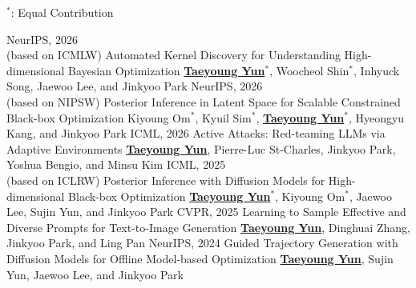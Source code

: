 \documentclass[10pt]{developercv} %
\begin{document}

\clearpage
{}

\vspace{-5pt}
$^*$: Equal Contribution
\vspace{8pt}

\begin{entrylist}
    \entry
        {NeurIPS, 2026 \\ (based on ICMLW)}
        {Automated Kernel Discovery for Understanding High-dimensional Bayesian Optimization}
        {}
        {\underline{\textbf{Taeyoung Yun}$^{*}$}, Woocheol Shin$^{*}$, Inhyuck Song, Jaewoo Lee, and Jinkyoo Park
        }
    \entry
        {NeurIPS, 2026  \\ (based on NIPSW)}
        {Posterior Inference in Latent Space for Scalable Constrained Black-box Optimization}
        {}
        {Kiyoung Om$^*$, Kyuil Sim$^*$, \underline{\textbf{Taeyoung Yun$^{*}$}}, Hyeongyu Kang, and Jinkyoo Park
        }
    \entry
        {ICML, 2026}
        {Active Attacks: Red-teaming LLMs via Adaptive Environments}
        {}
        {\underline{\textbf{Taeyoung Yun}}, Pierre-Luc St-Charles, Jinkyoo Park, Yoshua Bengio, and Minsu Kim
        }
    \entry
        {ICML, 2025 \\ (based on ICLRW)}
        {Posterior Inference with Diffusion Models for High-dimensional Black-box Optimization}
        {}
        {\underline{\textbf{Taeyoung Yun$^{*}$}}, Kiyoung Om$^*$, Jaewoo Lee, Sujin Yun, and Jinkyoo Park
        }
    \entry
        {CVPR, 2025}
        {Learning to Sample Effective and Diverse Prompts for Text-to-Image Generation}
        {}
        {\underline{\textbf{Taeyoung Yun}}, Dinghuai Zhang, Jinkyoo Park, and Ling Pan
        }
    \entry
        {NeurIPS, 2024}
        {Guided Trajectory Generation with Diffusion Models for Offline Model‑based Optimization}
        {}
        {\underline{\textbf{Taeyoung Yun}}, Sujin Yun, Jaewoo Lee, and Jinkyoo Park
        }
\end{entrylist}
\end{document}
